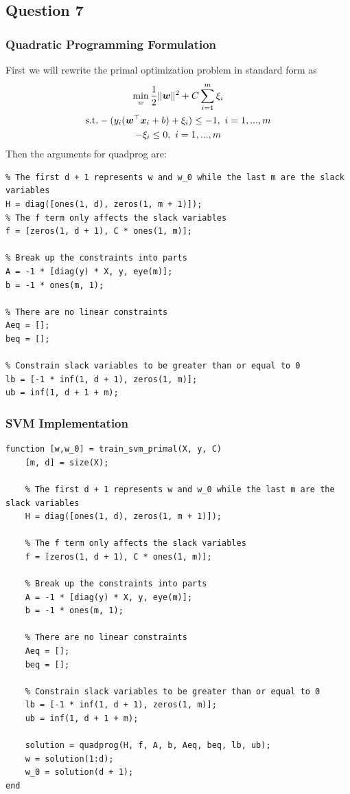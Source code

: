 \documentclass[11pt, oneside]{article}   	%
\begin{document}
\subsection{Question 7}
\subsubsection{Quadratic Programming Formulation}
First we will rewrite the primal optimization problem in standard form as
\begin{gather*}
\min_{w} \frac{1}{2}\lVert\boldsymbol{w}\rVert^2 + C \sum_{i = 1}^m \xi_i\\
\text{s.t.} -(y_i(\boldsymbol{w}^\top \boldsymbol{x}_i + b) + \xi_i) \leq -1, \text{ } i = 1, ..., m\\
-\xi_i \leq 0, \text{ } i = 1, ..., m
\end{gather*}
Then the arguments for quadprog are:
\begin{verbatim}
% The first d + 1 represents w and w_0 while the last m are the slack variables
H = diag([ones(1, d), zeros(1, m + 1)]);
% The f term only affects the slack variables
f = [zeros(1, d + 1), C * ones(1, m)];

% Break up the constraints into parts
A = -1 * [diag(y) * X, y, eye(m)];
b = -1 * ones(m, 1);

% There are no linear constraints
Aeq = [];
beq = [];

% Constrain slack variables to be greater than or equal to 0
lb = [-1 * inf(1, d + 1), zeros(1, m)];
ub = inf(1, d + 1 + m);
\end{verbatim}

\newpage{}
\subsubsection{SVM Implementation}
\begin{verbatim}
function [w,w_0] = train_svm_primal(X, y, C)
    [m, d] = size(X);
    
    % The first d + 1 represents w and w_0 while the last m are the slack variables
    H = diag([ones(1, d), zeros(1, m + 1)]);
    
    % The f term only affects the slack variables
    f = [zeros(1, d + 1), C * ones(1, m)];
    
    % Break up the constraints into parts
    A = -1 * [diag(y) * X, y, eye(m)];
    b = -1 * ones(m, 1);
    
    % There are no linear constraints
    Aeq = [];
    beq = [];
    
    % Constrain slack variables to be greater than or equal to 0
    lb = [-1 * inf(1, d + 1), zeros(1, m)];
    ub = inf(1, d + 1 + m);
    
    solution = quadprog(H, f, A, b, Aeq, beq, lb, ub);
    w = solution(1:d);
    w_0 = solution(d + 1);
end
\end{verbatim}
\end{document}
